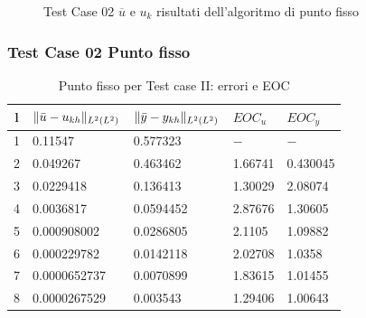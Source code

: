 \documentclass{beamer}
\theoremstyle{definition}
\theoremstyle{remark}
\theoremstyle{plain}
\theoremstyle{definition}
\DeclarePairedDelimiter{\norma}{\lVert}{\rVert}
\begin{document}
\begin{frame}
\begin{figure}
\caption{Test Case 02 $\overline{u}$ e $u_k$ risultati dell'algoritmo di punto fisso}
\label{fig:504}
\end{figure}

\end{frame}

\begin{frame}
\frametitle{Test Case 02 Punto fisso}

\begin{table}
\caption{Punto fisso per Test case II: errori e EOC }
\label{puntofissoII}
\centering

\begin{tabular}{cllll}
\toprule
{l}           &  {$ \norma{\bar{u}-u_{kh}}_{L^2(L^2)} $} &  {$ \norma{\bar{y}-y_{kh}}_{L^2(L^2)} $} &  {$ EOC_{u} $} &  {$ EOC_y $} \\
\midrule
1            &  0.11547 &  0.577323 &  {$-$} &  {$-$} \\
2            &  0.049267 &  0.463462 &  1.66741 &  0.430045 \\
3            &  0.0229418 &  0.136413 &  1.30029 &  2.08074 \\
4            &  0.0036817 &  0.0594452 &  2.87676 &  1.30605 \\
5            &  0.000908002 &  0.0286805 &  2.1105 &  1.09882 \\
6            &  0.000229782  &  0.0142118 &  2.02708 &  1.0358 \\
7            &  0.0000652737 &  0.0070899 &  1.83615 &  1.01455 \\      
8            &  0.0000267529 &  0.003543 &  1.29406 &  1.00643 \\
\bottomrule
\end{tabular}              

\end{table}


\end{frame}
\end{document}
